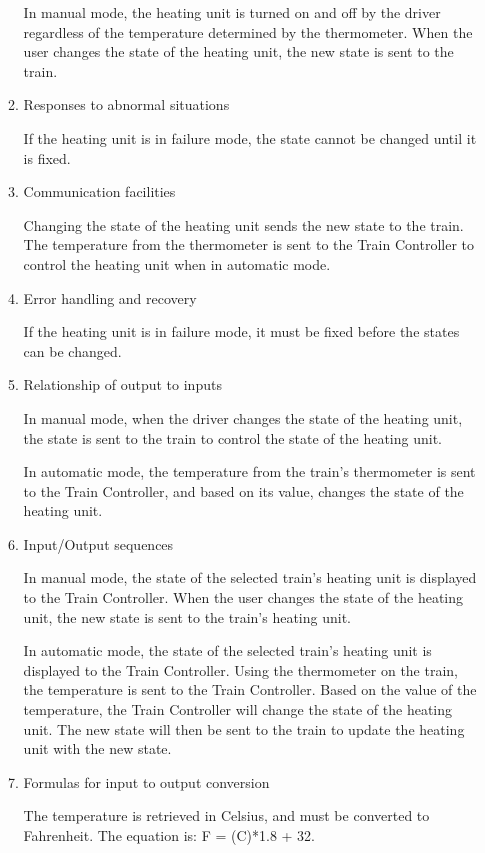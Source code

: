 \documentclass[11pt]{article}
\begin{document}
\begin{enumerate}
\begin{enumerate}
In manual mode, the heating unit is turned on and off by the driver regardless of the temperature determined by the thermometer. When the user changes the state of the heating unit, the new state is sent to the train.  
\item Responses to abnormal situations
\label{sec-3-1-5-7-3}

If the heating unit is in failure mode, the state cannot be changed until it is fixed. 
\item Communication facilities
\label{sec-3-1-5-7-4}

Changing the state of the heating unit sends the new state to the train. The temperature from the thermometer is sent to the Train Controller to control the heating unit when in automatic mode. 
\item Error handling and recovery
\label{sec-3-1-5-7-5}

If the heating unit is in failure mode, it must be fixed before the states can be changed. 
\item Relationship of output to inputs
\label{sec-3-1-5-7-6}

In manual mode, when the driver changes the state of the heating unit, the state is sent to the train to control the state of the heating unit.

In automatic mode, the temperature from the train's thermometer is sent to the Train Controller, and based on its value, changes the state of the heating unit. 
\item Input/Output sequences
\label{sec-3-1-5-7-7}

In manual mode, the state of the selected train's heating unit is displayed to the Train Controller. When the user changes the state of the heating unit, the new state is sent to the train's heating unit.

In automatic mode, the state of the selected train's heating unit is displayed to the Train Controller. Using the thermometer on the train, the temperature is sent to the Train Controller. Based on the value of the temperature, the Train Controller will change the state of the heating unit. The new state will then be sent to the train to update the heating unit with the new state.
\item Formulas for input to output conversion
\label{sec-3-1-5-7-8}

The temperature is retrieved in Celsius, and must be converted to Fahrenheit. The equation is: F = (C)*1.8 + 32.
\end{enumerate}


\end{enumerate}
\end{document}

